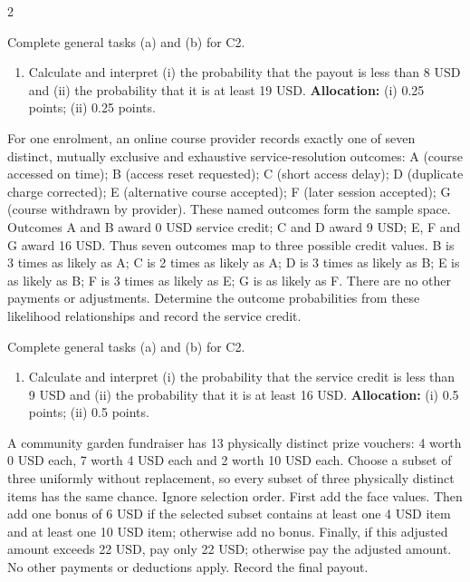 \begin{multicols*}{2}
\begin{minipage}{\linewidth}
Complete general tasks (a)  and (b)  for C2.
\begin{enumerate}[label=(\alph*),start=3]
\item {} Calculate and interpret (i) the probability that the payout is less than 8 USD and (ii) the probability that it is at least 19 USD.
\textbf{Allocation:} (i) 0.25 points; (ii) 0.25 points.
\end{enumerate}
\end{minipage}\par\medskip

\noindent\begin{minipage}{\linewidth}
For one enrolment, an online course provider records exactly one of seven distinct, mutually exclusive and exhaustive service-resolution outcomes: A (course accessed on time); B (access reset requested); C (short access delay); D (duplicate charge corrected); E (alternative course accepted); F (later session accepted); G (course withdrawn by provider). These named outcomes form the sample space. Outcomes A and B award 0 USD service credit; C and D award 9 USD; E, F and G award 16 USD. Thus seven outcomes map to three possible credit values. B is 3 times as likely as A; C is 2 times as likely as A; D is 3 times as likely as B; E is as likely as B; F is 3 times as likely as E; G is as likely as F. There are no other payments or adjustments. Determine the outcome probabilities from these likelihood relationships and record the service credit.

Complete general tasks (a)  and (b)  for C2.
\begin{enumerate}[label=(\alph*),start=3]
\item {} Calculate and interpret (i) the probability that the service credit is less than 9 USD and (ii) the probability that it is at least 16 USD.
\textbf{Allocation:} (i) 0.5 points; (ii) 0.5 points.
\end{enumerate}
\end{minipage}\par\medskip

\noindent\begin{minipage}{\linewidth}
A community garden fundraiser has 13 physically distinct prize vouchers: 4 worth 0 USD each, 7 worth 4 USD each and 2 worth 10 USD each. Choose a subset of three uniformly without replacement, so every subset of three physically distinct items has the same chance. Ignore selection order. First add the face values. Then add one bonus of 6 USD if the selected subset contains at least one 4 USD item and at least one 10 USD item; otherwise add no bonus. Finally, if this adjusted amount exceeds 22 USD, pay only 22 USD; otherwise pay the adjusted amount. No other payments or deductions apply. Record the final payout.


\end{minipage}
\end{multicols*}
